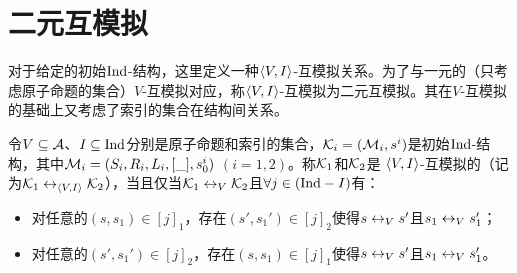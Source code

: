 \section{二元互模拟}
\label{chapter4:sub:biVB}
对于给定的初始$\textrm{Ind}$-结构，这里定义一种${\langle{V, I}\rangle}$-互模拟关系。为了与一元的（只考虑原子命题的集合）$V$-互模拟对应，称${\langle{V, I}\rangle}$-互模拟为二元互模拟。其在$V$-互模拟的基础上又考虑了索引的集合在结构间关系。
\begin{definition}[二元互模拟] \label{def:VInd:bisimulation}
	令$V\subseteq {\cal A}$、$I\subseteq \textrm{Ind}$分别是原子命题和索引的集合，${\cal K}_i=({\cal M}_i,s^i)$是初始$\textrm{Ind}$-结构，其中${\cal M}_i=(S_i, R_i, L_i, [\_],s_0^i)$ $(i=1,2)$。称${\cal K}_1$和${\cal K}_2$是 ${\langle{V, I}\rangle}$-互模拟的（记为${\cal K}_1 \leftrightarrow_{{\langle{V, I}\rangle}} {\cal K}_2$），当且仅当${\cal K}_1 \leftrightarrow_V {\cal K}_2$且$\forall j\in (\textrm{Ind} - I)$有：
	\begin{itemize}
		\item 对任意的$(s,s_1) \in [j]_1$，存在$(s',s_1')\in [j]_2$使得$s\leftrightarrow_V s'$且$s_1 \leftrightarrow_V s_1'$；
		\item 对任意的$(s',s_1') \in [j]_2$，存在$(s,s_1)\in [j]_1$使得$s\leftrightarrow_V s'$且$s_1 \leftrightarrow_V s_1'$。
	\end{itemize}
	
\end{definition}

